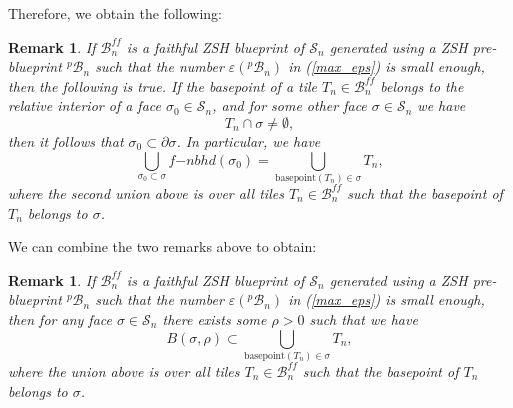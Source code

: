 \documentclass[12pt,letterpaper]{article}
\newtheorem{rem}[thm]{Remark}
\renewcommand{\S}{\mathcal{S}}
\newcommand{\B}{\mathcal{B}}
\newcommand{\eps}{\varepsilon}
\newcommand{\nbhd}{\mathit{nbhd}}
\begin{document}

\bigskip



\noindent
Therefore, we obtain the following:

\begin{rem}
%
\label{rem:basepoints_of_tiles_on_interior_of_faces_FOR_FAITHFUL}
If $\B_n^\mathit{ff}$ is a faithful ZSH blueprint of $\S_n$ generated using a ZSH pre-blueprint $^p\!\B_n$ such that the number $\eps(^p\!\B_n)$ in (\ref{max_eps}) is small enough, then the following is true. 
If the basepoint of a tile $T_n \in \B_n^\mathit{ff}$ belongs to the relative interior of a face $\sigma_0 \in \S_n$, and for some other face $\sigma \in \S_n$ we have 
$$
T_n \cap \sigma \neq \emptyset,
$$
then it follows that $\sigma_0 \subset \partial \sigma$.
%
In particular,  we have 
%
\begin{equation}
\label{eqn:face_inside_union_of_nbhds}
\bigcup_{\sigma_0 \subset \sigma} f\mathrm{-}\nbhd(\sigma_0) = \bigcup_{\text{basepoint}(T_n) \in \sigma} T_n,
\end{equation}
%
where the second union above is over all tiles $T_n \in \B_n^\mathit{ff}$ such that the basepoint of $T_n$ belongs to $\sigma$.
%
\end{rem}





\bigskip

\bigskip

\noindent
We can combine the two remarks above to obtain:



\begin{rem}
\label{rem:neighborhood_of_face_inside_union_of____TILES____FOR_FAITHFUL}
%
If $\B_n^\mathit{ff}$ is a faithful ZSH blueprint of $\S_n$ generated using a ZSH pre-blueprint $^p\!\B_n$ such that the number $\eps(^p\!\B_n)$ in (\ref{max_eps}) is small enough,
then for any face $\sigma \in \S_n$ there exists some $\rho>0$ such that  we have 
%
\begin{equation}
\label{eqn:neighborhood_of_face_inside_union_of____TILES____FOR_FAITHFUL}
B(\sigma, \rho) \subset \bigcup_{\text{basepoint}(T_n) \in \sigma} T_n,
\end{equation}
%
where the  union above is over all tiles $T_n \in \B_n^\mathit{ff}$ such that the basepoint of $T_n$ belongs to $\sigma$.
%
\end{rem}
\end{document}
